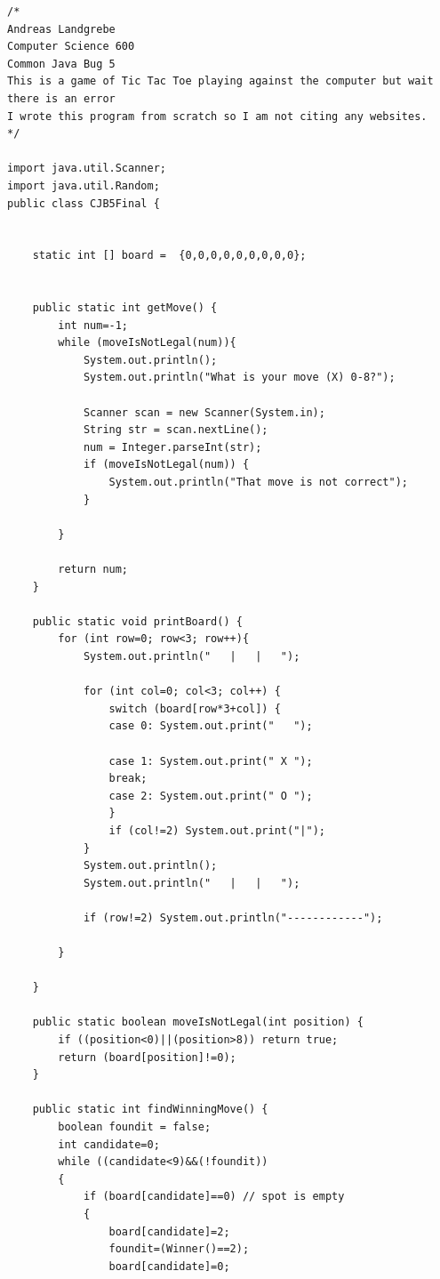\begin{lstlisting}
/*
Andreas Landgrebe
Computer Science 600
Common Java Bug 5
This is a game of Tic Tac Toe playing against the computer but wait there is an error
I wrote this program from scratch so I am not citing any websites.
*/

import java.util.Scanner;
import java.util.Random;
public class CJB5Final {
  
  
    static int [] board =  {0,0,0,0,0,0,0,0,0};
  
  
    public static int getMove() {
        int num=-1;
        while (moveIsNotLegal(num)){
            System.out.println();
            System.out.println("What is your move (X) 0-8?");
              
            Scanner scan = new Scanner(System.in);
            String str = scan.nextLine();
            num = Integer.parseInt(str);
            if (moveIsNotLegal(num)) {
                System.out.println("That move is not correct");
            }
      
        }
  
        return num;
    }
      
    public static void printBoard() {
        for (int row=0; row<3; row++){
            System.out.println("   |   |   ");
  
            for (int col=0; col<3; col++) {
                switch (board[row*3+col]) {
                case 0: System.out.print("   ");

                case 1: System.out.print(" X ");
                break;
                case 2: System.out.print(" O ");
                }
                if (col!=2) System.out.print("|");
            }
            System.out.println();
            System.out.println("   |   |   ");
  
            if (row!=2) System.out.println("------------");
  
        }
          
    }
  
    public static boolean moveIsNotLegal(int position) {
        if ((position<0)||(position>8)) return true;
        return (board[position]!=0);
    }
      
    public static int findWinningMove() {
        boolean foundit = false;
        int candidate=0;
        while ((candidate<9)&&(!foundit))
        {
            if (board[candidate]==0) // spot is empty
            {
                board[candidate]=2;
                foundit=(Winner()==2);
                board[candidate]=0;
  

\end{lstlisting}
